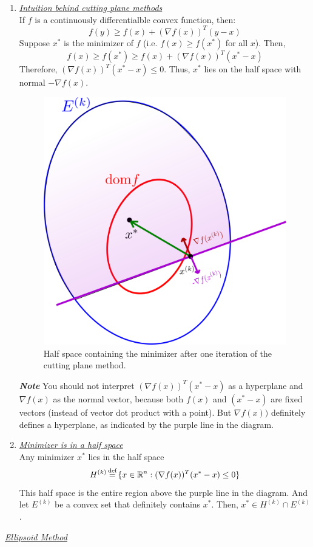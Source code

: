 \documentclass[12pt]{article}
\newcommand\defeq{\stackrel{\mathclap{\normalfont\mbox{\scriptsize def}}}{=}}
\newcommand{\istart}[1]{\underline{\textit{#1}}\\}
\newcommand{\idetail}[1]{\footnotesize\textbf{\emph{#1}}\normalsize}
\newcommand{\bR}{\mathbb{R}}
\begin{document}
\begin{enumerate}
\item \istart{Intuition behind cutting plane methods} If $f$ is a continuously differentialble convex function, then:
  $$f(y)\geq f(x)+(\nabla f(x))^T(y-x)$$
  Suppose $x^*$ is the minimizer of $f$ (i.e. $f(x)\geq f(x^*)$ for all $x$). Then,
  $$f(x)\geq f(x^*)\geq f(x) + (\nabla f(x))^T(x^*-x)$$
  Therefore, $(\nabla f(x))^T(x^*-x)\leq 0$. Thus, $x^*$ lies on the half space with normal $-\nabla f(x)$.
  \begin{figure}[h]
    \centering
    \includegraphics[scale=0.5]{figs/cutting}
    \caption{Half space containing the minimizer after one iteration of the cutting plane method.}
    \label{fig:cutting}
  \end{figure}
  
  \idetail{Note} You should not interpret $(\nabla f(x))^T(x^*-x)$ as a hyperplane and $\nabla f(x)$ as the normal vector, because both $f(x)$ and $(x^*-x)$ are fixed vectors (instead of vector dot product with a point). But $\nabla f(x))$ definitely defines a hyperplane, as indicated by the purple line in the diagram.

\item \istart{Minimizer is in a half space}
  Any minimizer $x^*$ lies in the half space
  $$H^{(k)}\defeq\{x\in\bR^n: (\nabla f(x))^T(x^*-x)\leq 0\}$$
  This half space is the entire region above the purple line in the diagram. And let $E^{(k)}$ be a convex set that definitely contains $x^*$. Then, $x^*\in H^{(k)}\cap E^{(k)}$.
\end{enumerate}

\item \istart{Ellipsoid Method}
\end{document}
